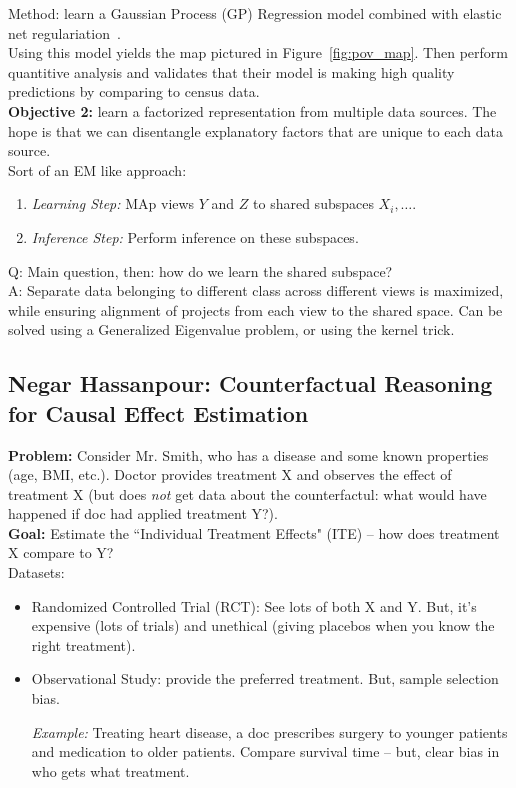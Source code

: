 Method: learn a Gaussian Process (GP) Regression model combined with elastic net regulariation~\cite{zou2005regularization}. \\

Using this model yields the map pictured in Figure~\ref{fig:pov_map}. Then perform quantitive analysis and validates that their model is making high quality predictions by comparing to census data. \\

{\bf Objective 2:} learn a factorized representation from multiple data sources. The hope is that we can disentangle explanatory factors that are unique to each data source. \\

Sort of an EM like approach:
\begin{enumerate}
    \item {\it Learning Step:} MAp views $Y$ and $Z$ to shared subspaces $X_i, \ldots$.
    \item {\it Inference Step:} Perform inference on these subspaces.
\end{enumerate}

Q: Main question, then: how do we learn the shared subspace?\\

A: Separate data belonging to different class across different views is maximized, while ensuring alignment of projects from each view to the shared space. Can be solved using a Generalized Eigenvalue problem, or using the kernel trick.



\spacerule
\subsection{Negar Hassanpour: Counterfactual Reasoning for Causal Effect Estimation}

{\bf Problem:} Consider Mr. Smith, who has a disease and some known properties (age, BMI, etc.). Doctor provides treatment X and observes the effect of treatment X (but does {\it not} get data about the counterfactul: what would have happened if doc had applied treatment Y?). \\

{\bf Goal:} Estimate the ``Individual Treatment Effects" (ITE) -- how does treatment X compare to Y? \\

Datasets:
\begin{itemize}
    \item Randomized Controlled Trial (RCT): See lots of both X and Y. But, it's expensive (lots of trials) and unethical (giving placebos when you know the right treatment).
    \item Observational Study: provide the preferred treatment. But, sample selection bias.
    
    {\it Example:} Treating heart disease, a doc prescribes surgery to younger patients and medication to older patients. Compare survival time -- but, clear bias in who gets what treatment.
\end{itemize}

